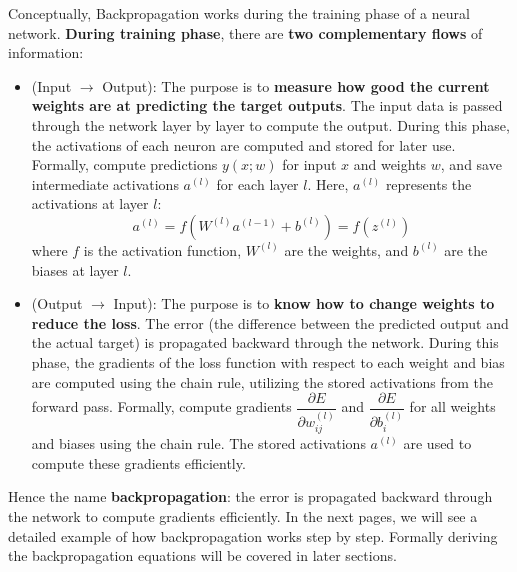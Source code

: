 \highspace
Conceptually, Backpropagation works during the training phase of a neural network. \textbf{During training phase}, there are \textbf{two complementary flows} of information:
\begin{itemize}
    \item {} (Input $\to$ Output): The purpose is to \textbf{measure how good the current weights are at predicting the target outputs}. The input data is passed through the network layer by layer to compute the output. During this phase, the activations of each neuron are computed and stored for later use. Formally, compute predictions $y(x;w)$ for input $x$ and weights $w$, and save intermediate activations $a^{(l)}$ for each layer $l$. Here, $a^{(l)}$ represents the activations at layer $l$:
    \begin{equation*}
        a^{(l)} = f\left( W^{(l)} a^{(l-1)} + b^{(l)} \right) = f(z^{(l)})
    \end{equation*}
    where $f$ is the activation function, $W^{(l)}$ are the weights, and $b^{(l)}$ are the biases at layer $l$.

    \item {} (Output $\to$ Input): The purpose is to \textbf{know how to change weights to reduce the loss}. The error (the difference between the predicted output and the actual target) is propagated backward through the network. During this phase, the gradients of the loss function with respect to each weight and bias are computed using the chain rule, utilizing the stored activations from the forward pass. Formally, compute gradients $\dfrac{\partial E}{\partial w_{ij}^{(l)}}$ and $\dfrac{\partial E}{\partial b_{i}^{(l)}}$ for all weights and biases using the chain rule. The stored activations $a^{(l)}$ are used to compute these gradients efficiently.
\end{itemize}
Hence the name \textbf{backpropagation}: the error is propagated backward through the network to compute gradients efficiently. In the next pages, we will see a detailed example of how backpropagation works step by step. Formally deriving the backpropagation equations will be covered in later sections.

